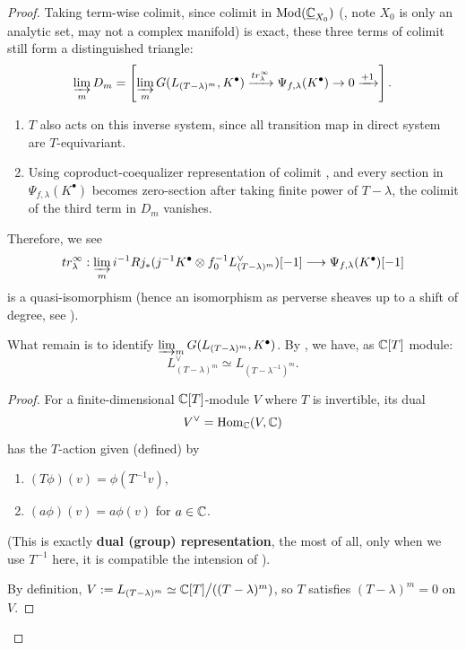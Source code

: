 \begin{proof}
    Taking term-wise colimit, since colimit in $\mathrm{Mod}(\underline{\mathbb{C}}_{X_0})$ (\cite[\href{https://stacks.math.columbia.edu/tag/01AH}{Tag 01AH}]{stacks-project}, note $X_0$ is only an analytic set, may not a complex manifold) is exact, these three terms of colimit still form a distinguished triangle:
    \[
        \varinjlim_m D_m = \left[ \varinjlim_m G(L_{(T-\lambda)^m}, {K^\bullet}) \xrightarrow{tr^\infty_{\lambda}} \Psi_{f,\lambda}(K^\bullet) \to 0 \xrightarrow{+1} \right].
    \]
    \begin{enumerate}
        \item $T$ also acts on this inverse system, since all transition map in direct system are $T$-equivariant.
        \item Using coproduct-coequalizer representation of colimit \cite[\href{https://stacks.math.columbia.edu/tag/002P}{002P}]{stacks-project}, and every section in $\Psi_{f,\lambda}(K^\bullet)$ becomes zero-section after taking finite power of $T-\lambda$, the colimit of the third term in $D_m$ vanishes.
    \end{enumerate}
    Therefore, we see
    \[
        tr^{\infty}_\lambda : \varinjlim_m i^{-1}Rj_*(j^{-1} K^\bullet \otimes f_0^{-1}L^\vee_{(T-\lambda)^m})[-1] \longrightarrow \Psi_{f,\lambda}(K^\bullet)[-1]
    \]
    is a quasi-isomorphism (hence an isomorphism as perverse sheaves up to a shift of degree, see \cite[Thm.~3.1]{Wu2017NearbyVanishingCycles}).

    \medskip

    What remain is to identify $\varinjlim_m G(L_{(T-\lambda)^m}, {K^\bullet})$. By \cite[Lemma~3.8]{Wu2017NearbyVanishingCycles}, we have, as $\mathbb{C}[T]$ module:
    \[
        L_{(T-\lambda)^m}^\vee \simeq L_{(T-\lambda^{-1})^m}.
    \]
    \begin{proof}
        For a finite-dimensional $\mathbb{C}[T]$-module $V$ where $T$ is invertible,
        its dual
        \[
            V^\vee = \operatorname{Hom}_{\mathbb{C}}(V, \mathbb{C})
        \]
        has the $T$-action given (defined) by
        \begin{enumerate}
            \item $(T \phi)(v) = \phi(T^{-1} v)$,
            \item $(a \phi)(v) = a \phi(v)$ for $a \in \mathbb{C}$.
        \end{enumerate}
        (This is exactly \textbf{dual (group) representation},
        the most of all, only when we use $T^{-1}$ here, it is compatible the intension of \cite[Lem.~3.8]{Wu2017NearbyVanishingCycles}).

        By definition, $V:= L_{(T-\lambda)^m} \simeq \mathbb{C}[T]\big/((T-\lambda)^m)$,
        so $T$ satisfies $(T - \lambda)^m = 0$ on $V$.


\end{proof}
\end{proof}
